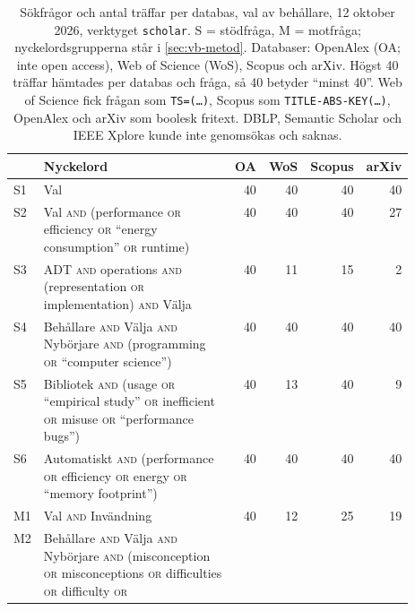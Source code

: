 \begin{table}[!b]
  \caption{Sökfrågor och antal träffar per databas, val av behållare,
    12 oktober 2026, verktyget \texttt{scholar}.  S = stödfråga, M =
    motfråga; nyckelordsgrupperna står i \cref{sec:vb-metod}.  Databaser:
    OpenAlex (OA; inte \foreignlanguage{english}{open access}), Web of
    Science (WoS), Scopus och arXiv.  Högst 40 träffar hämtades per
    databas och fråga, så 40 betyder \enquote{minst 40}.  Web of Science
    fick frågan som \texttt{TS=(\dots)}, Scopus som
    \texttt{TITLE-ABS-KEY(\dots)}, OpenAlex och arXiv som boolesk
    fritext.  DBLP, Semantic Scholar och IEEE Xplore kunde inte
    genomsökas och saknas.}
  \label{tab:sok-queries-valja}
  \centering\footnotesize
  \begin{tabular}{@{}lp{0.52\linewidth}rrrr@{}}
    \toprule
    & Nyckelord & OA & WoS & Scopus & arXiv \\
    \midrule
    S1 & Val & 40 & 40 & 40 & 40 \\
    S2 & Val \textsc{and} (performance \textsc{or} efficiency
         \textsc{or} \enquote{energy consumption} \textsc{or} runtime)
       & 40 & 40 & 40 & 27 \\
    S3 & ADT \textsc{and} operations \textsc{and} (representation
         \textsc{or} implementation) \textsc{and} Välja
       & 40 & 11 & 15 & 2 \\
    S4 & Behållare \textsc{and} Välja \textsc{and} Nybörjare
         \textsc{and} (programming \textsc{or} \enquote{computer
         science})
       & 40 & 40 & 40 & 40 \\
    S5 & Bibliotek \textsc{and} (usage \textsc{or} \enquote{empirical
         study} \textsc{or} inefficient \textsc{or} misuse \textsc{or}
         \enquote{performance bugs})
       & 40 & 13 & 40 & 9 \\
    S6 & Automatiskt \textsc{and} (performance \textsc{or} efficiency
         \textsc{or} energy \textsc{or} \enquote{memory footprint})
       & 40 & 40 & 40 & 40 \\
    \midrule
    M1 & Val \textsc{and} Invändning & 40 & 12 & 25 & 19 \\
    M2 & Behållare \textsc{and} Välja \textsc{and} Nybörjare
         \textsc{and} (misconception \textsc{or} misconceptions
         \textsc{or} difficulties \textsc{or} difficulty \textsc{or}

\end{tabular}
\end{table}
